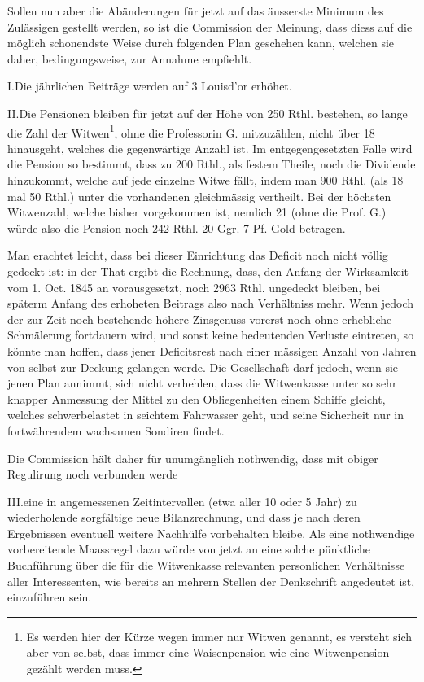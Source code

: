 \par{}
Sollen nun aber die Abänderungen für jetzt auf das äusserste Minimum des Zulässigen gestellt werden, so ist die Commission der Meinung, dass diess auf die möglich schonendste Weise durch folgenden Plan geschehen kann, welchen sie daher, bedingungsweise, zur Annahme empfiehlt.

I.\quad Die jährlichen Beiträge werden auf 3 Louisd’or erhöhet.

II.\quad Die Pensionen bleiben für jetzt auf der Höhe von 250 Rthl. bestehen, so lange die Zahl der Witwen\footnote{Es werden hier der Kürze wegen immer nur Witwen genannt, es versteht sich aber von selbst, dass immer eine Waisenpension wie eine Witwenpension gezählt werden muss.}, ohne die Professorin G. mitzuzählen, nicht über 18 hinausgeht, welches die gegenwärtige Anzahl ist. Im entgegengesetzten Falle wird die Pension so bestimmt, dass zu 200 Rthl., als festem Theile, noch die Dividende hinzukommt, welche auf jede einzelne Witwe fällt, indem man 900 Rthl. (als 18 mal 50 Rthl.) unter die vorhandenen gleichmässig vertheilt. Bei der höchsten Witwenzahl, welche bisher vorgekommen ist, nemlich 21 (ohne die Prof. G.) würde also die Pension noch 242 Rthl. 20 Ggr. 7 Pf. Gold betragen.

Man erachtet leicht, dass bei dieser Einrichtung das Deficit noch nicht völlig gedeckt ist: in der That ergibt die Rechnung, dass, den Anfang der Wirksamkeit vom 1. Oct. 1845 an vorausgesetzt, noch 2963 Rthl. ungedeckt bleiben, bei späterm Anfang des erhoheten Beitrags also nach Verhältniss mehr. Wenn jedoch der zur Zeit noch bestehende höhere Zinsgenuss vorerst noch ohne erhebliche Schmälerung fortdauern wird, und sonst keine bedeutenden Verluste eintreten, so könnte man hoffen, dass jener Deficitsrest nach einer mässigen Anzahl von Jahren von selbst zur Deckung gelangen werde. Die Gesellschaft darf jedoch, wenn sie jenen Plan annimmt, sich nicht verhehlen, dass die Witwenkasse unter so sehr knapper Anmessung der Mittel zu den Obliegenheiten einem Schiffe gleicht, welches schwerbelastet in seichtem Fahrwasser geht, und seine Sicherheit nur in fortwährendem wachsamen Sondiren findet.

Die Commission hält daher für unumgänglich nothwendig, dass mit obiger Regulirung noch verbunden werde

III.\quad eine in angemessenen Zeitintervallen (etwa aller 10 oder 5 Jahr) zu wiederholende sorgfältige neue Bilanzrechnung, und dass je nach deren Ergebnissen eventuell weitere Nachhülfe vorbehalten bleibe. Als eine nothwendige vorbereitende Maassregel dazu würde von jetzt an eine solche pünktliche Buchführung über die für die Witwenkasse relevanten personlichen Verhältnisse aller Interessenten, wie bereits an mehrern Stellen der Denkschrift angedeutet ist, einzuführen sein.

